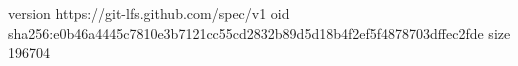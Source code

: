 version https://git-lfs.github.com/spec/v1
oid sha256:e0b46a4445c7810e3b7121cc55cd2832b89d5d18b4f2ef5f4878703dffec2fde
size 196704
